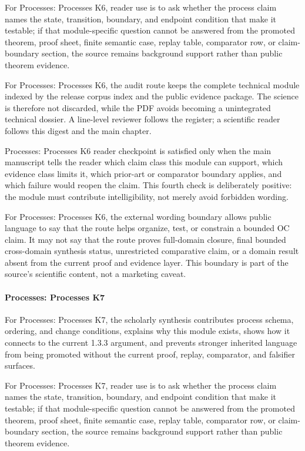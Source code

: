 For Processes: Processes K6, reader use is to ask whether the process claim names the state, transition, boundary, and endpoint condition that make it testable; if that module-specific question cannot be answered from the promoted theorem, proof sheet, finite semantic case, replay table, comparator row, or claim-boundary section, the source remains background support rather than public theorem evidence.


For Processes: Processes K6, the audit route keeps the complete technical module indexed by the release corpus index and the public evidence package. The science is therefore not discarded, while the PDF avoids becoming a unintegrated technical dossier. A line-level reviewer follows the register; a scientific reader follows this digest and the main chapter.


Processes: Processes K6 reader checkpoint is satisfied only when the main manuscript tells the reader which claim class this module can support, which evidence class limits it, which prior-art or comparator boundary applies, and which failure would reopen the claim. This fourth check is deliberately positive: the module must contribute intelligibility, not merely avoid forbidden wording.


For Processes: Processes K6, the external wording boundary allows public language to say that the route helps organize, test, or constrain a bounded OC claim. It may not say that the route proves full-domain closure, final bounded cross-domain synthesis status, unrestricted comparative claim, or a domain result absent from the current proof and evidence layer. This boundary is part of the source's scientific content, not a marketing caveat.


\paragraph{Processes: Processes K7}

For Processes: Processes K7, the scholarly synthesis contributes process schema, ordering, and change conditions, explains why this module exists, shows how it connects to the current 1.3.3 argument, and prevents stronger inherited language from being promoted without the current proof, replay, comparator, and falsifier surfaces.


For Processes: Processes K7, reader use is to ask whether the process claim names the state, transition, boundary, and endpoint condition that make it testable; if that module-specific question cannot be answered from the promoted theorem, proof sheet, finite semantic case, replay table, comparator row, or claim-boundary section, the source remains background support rather than public theorem evidence.


